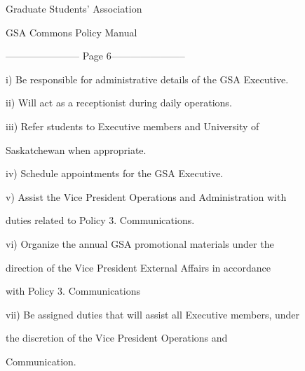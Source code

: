                                        

                                     Graduate Students’ Association  

                                     GSA Commons Policy Manual  

  


----------------------- Page 6-----------------------

         i)       Be responsible for administrative details of the GSA Executive.   



  



         ii)      Will act as a receptionist during daily operations.   



  



         iii)     Refer   students         to   Executive        members        and     University       of  

                  Saskatchewan when appropriate.   



  



         iv)      Schedule appointments for the GSA Executive.   



  



         v)       Assist  the  Vice  President  Operations  and  Administration  with  

                  duties related to Policy 3.  Communications.   



         vi)      Organize  the  annual  GSA  promotional  materials  under  the  

                  direction  of the  Vice President  External  Affairs  in accordance  

                  with Policy 3. Communications  



  



         vii)     Be assigned duties that will assist all Executive members, under  

                  the     discretion       of     the    Vice       President       Operations         and  

                  Communication.   



